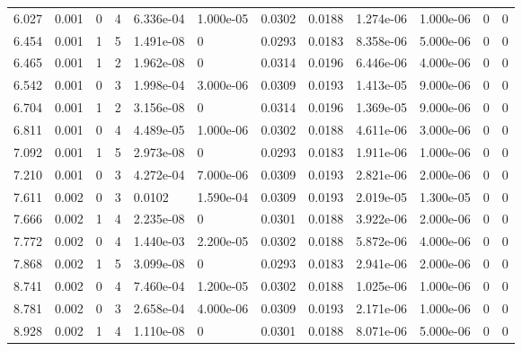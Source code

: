\documentclass[preview]{standalone}
\begin{document}
{{\begin{tabular}{L{1.2cm}C{1.2cm} C{0.3cm}C{0.5cm} C{1.4cm}C{1.4cm} C{1.4cm}C{1.4cm} C{1.6cm}C{1.6cm} C{1.6cm}C{1.6cm}}
  6.027  &  0.001  & 0     &  4 &  6.336e-04  & 1.000e-05  &  0.0302&   0.0188& 1.274e-06 & 1.000e-06   &  0 & 0  \\ 
  6.454  &  0.001  & 1     &  5 &  1.491e-08  & 0  &  0.0293&   0.0183& 8.358e-06 & 5.000e-06   &  0 & 0  \\ 
  6.465  &  0.001  & 1     &  2 &  1.962e-08  & 0  &  0.0314&   0.0196& 6.446e-06 & 4.000e-06   &  0 & 0  \\ 
  6.542  &  0.001  & 0     &  3 &  1.998e-04  & 3.000e-06  &  0.0309&   0.0193& 1.413e-05 & 9.000e-06   &  0 & 0  \\ 
  6.704  &  0.001  & 1     &  2 &  3.156e-08  & 0  &  0.0314&   0.0196& 1.369e-05 & 9.000e-06   &  0 & 0  \\ 
  6.811  &  0.001  & 0     &  4 &  4.489e-05  & 1.000e-06  &  0.0302&   0.0188& 4.611e-06 & 3.000e-06   &  0 & 0  \\ 
  7.092  &  0.001  & 1     &  5 &  2.973e-08  & 0  &  0.0293&   0.0183& 1.911e-06 & 1.000e-06   &  0 & 0  \\ 
  7.210  &  0.001  & 0     &  3 &  4.272e-04  & 7.000e-06  &  0.0309&   0.0193& 2.821e-06 & 2.000e-06   &  0 & 0  \\ 
  7.611  &  0.002  & 0     &  3 &  0.0102  & 1.590e-04  &  0.0309&   0.0193& 2.019e-05 & 1.300e-05   &  0 & 0  \\ 
  7.666  &  0.002  & 1     &  4 &  2.235e-08  & 0  &  0.0301&   0.0188& 3.922e-06 & 2.000e-06   &  0 & 0  \\ 
  7.772  &  0.002  & 0     &  4 &  1.440e-03  & 2.200e-05  &  0.0302&   0.0188& 5.872e-06 & 4.000e-06   &  0 & 0  \\ 
  7.868  &  0.002  & 1     &  5 &  3.099e-08  & 0  &  0.0293&   0.0183& 2.941e-06 & 2.000e-06   &  0 & 0  \\ 
  8.741  &  0.002  & 0     &  4 &  7.460e-04  & 1.200e-05  &  0.0302&   0.0188& 1.025e-06 & 1.000e-06   &  0 & 0  \\ 
  8.781  &  0.002  & 0     &  3 &  2.658e-04  & 4.000e-06  &  0.0309&   0.0193& 2.171e-06 & 1.000e-06   &  0 & 0  \\ 
  8.928  &  0.002  & 1     &  4 &  1.110e-08  & 0  &  0.0301&   0.0188& 8.071e-06 & 5.000e-06   &  0 & 0  \\ 
\hline 
\end{tabular} 

}}
\end{document}
